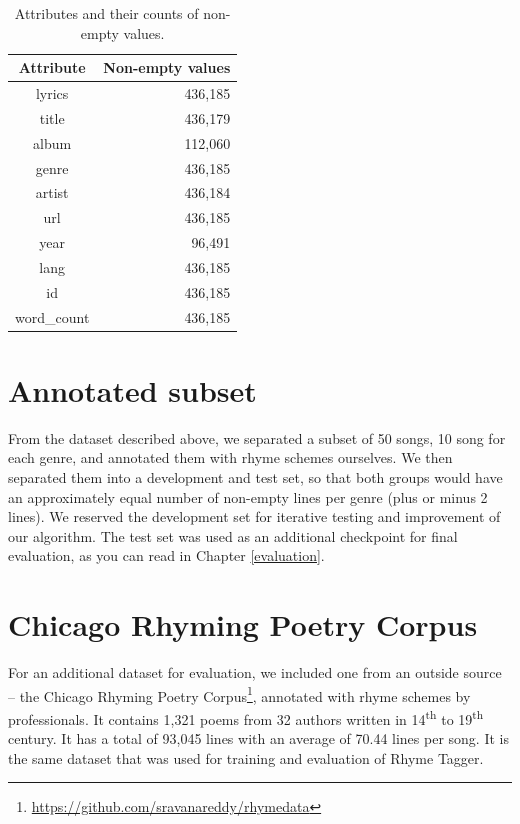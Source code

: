 \begin{table}[h!]
	\centering
	\begin{tabular}{| c | r |} 
		\hline
		Attribute & Non-empty values \\ [0.5ex] 
		\hline
		lyrics & 436,185 \\
		title & 436,179 \\
		album & 112,060 \\
		genre & 436,185 \\ 
		artist & 436,184 \\ 
		url & 436,185 \\
		year & 96,491 \\ 
		lang & 436,185 \\
		id & 436,185 \\
		word\_count & 436,185 \\
		\hline
	\end{tabular}
	\caption{Attributes and their counts of non-empty values.}
	\label{stats_nonempty_values}
\end{table}

\section{Annotated subset}
From the dataset described above, we separated a subset of 50 songs, 10 song for each genre, and annotated them with rhyme schemes ourselves. We then separated them into a development and test set, so that both groups would have an approximately equal number of non-empty lines per genre (plus or minus 2 lines). We reserved the development set for iterative testing and improvement of our algorithm. The test set was used as an additional checkpoint for final evaluation, as you can read in Chapter \ref{evaluation}.

\section{Chicago Rhyming Poetry Corpus}
For an additional dataset for evaluation, we included one from an outside source -- the Chicago Rhyming Poetry Corpus\footnote{\url{https://github.com/sravanareddy/rhymedata}}, annotated with rhyme schemes by professionals. It contains 1,321 poems from 32 authors written in 14\textsuperscript{th} to 19\textsuperscript{th} century. It has a total of 93,045 lines with an average of 70.44 lines per song. It is the same dataset that was used for training and evaluation of Rhyme Tagger.



